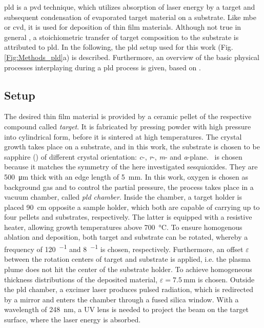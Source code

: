 \gls{pld} is a \gls{pvd} technique, which utilizes absorption of laser energy by a target and subsequent condensation of evaporated target material on a substrate.
Like \gls{mbe} or \gls{cvd}, it is used for deposition of thin film materials.
Although not true in general \cite{lorenz2019}, a stoichiometric transfer of target composition to the substrate is attributed to \gls{pld}.
In the following, the \gls{pld} setup used for this work (Fig.\,\ref{Fig:Methods_pld}a) is described.
Furthermore, an overview of the basic physical processes interplaying during a \gls{pld} process is given, based on \textcite{lorenz2019}.

\subsection{Setup}\label{Sec:Methods_pld}
The desired thin film material is provided by a ceramic pellet of the respective compound called \emph{target}.
It is fabricated by pressing powder with high pressure into cylindrical form, before it is sintered at high temperatures.
The crystal growth takes place on a substrate, and in this work, the substrate is chosen to be sapphire () of different crystal orientation: \textit{c}-, \textit{r}-, \textit{m}- and \textit{a}-plane.
\alo\ is chosen because it matches the symmetry of the here investigated sesquioxides.
They are \qty{500}{\um} thick with an edge length of \qty{5}{\mm}.
%
In this work, oxygen is chosen as background gas and to control the partial pressure, the process takes place in a vacuum chamber, called \emph{\gls{pld} chamber}.
Inside the chamber, a target holder is placed \qty{90}{\cm} opposite a sample holder, which both are capable of carrying up to four pellets and substrates, respectively.
The latter is equipped with a resistive heater, allowing growth temperatures above \qty{700}{\celsius}.
To ensure homogenous ablation and deposition, both target and substrate can be rotated, whereby a frequency of \qty{120}{\min^{-1}} and \qty{8}{\min^{-1}} is chosen, respectively.
Furthermore, an offset $\varepsilon$ between the rotation centers of target and substrate is applied, i.e. the plasma plume does not hit the center of the substrate holder.
To achieve homogeneous thickness distributions of the deposited material, $\varepsilon=\qty{7.5}{\mm}$ is chosen.
Outside the \gls{pld} chamber, a  excimer laser produces pulsed radiation, which is redirected by a mirror and enters the chamber through a fused silica window.
With a wavelength of \qty{248}{\nm}, a UV lens is needed to project the beam on the target surface, where the laser energy is absorbed.
